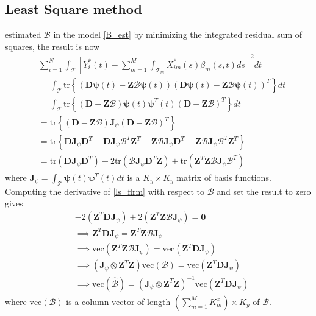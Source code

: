 \subsection{Least Square method}
\cite{olberd:ramsay} estimated $\bm{\mathcal{B}}$ in the model \eqref{B_est} by minimizing the integrated residual sum of squares, the result is now
\begin{align}
& \sum_{i=1}^{N} \int_{\mathcal{T}} \left[Y^{*}_i(t) - \sum_{m=1}^{M} \int_{\mathcal{T}_m} X^{*}_{im}(s) \beta_{m}(s,t)ds\right]^2 dt \nonumber \\
&= \int_{\mathcal{T}} \text{tr} \left\{\left(\bm{D} \bm{\psi}(t) - \bm{Z} \bm{\mathcal{B}} \bm{\psi}(t)\right)\left(\bm{D} \bm{\psi}(t) - \bm{Z} \bm{\mathcal{B}} \bm{\psi}(t)\right)^T \right\} dt \nonumber \\
&= \int_{\mathcal{T}} \text{tr} \left\{\left(\bm{D} - \bm{Z} \bm{\mathcal{B}} \right) \bm{\psi}(t)  \bm{\psi}^T(t) \left(\bm{D} - \bm{Z} \bm{\mathcal{B}} \right)^T \right\} dt \nonumber \\
&= \text{tr} \left\{\left(\bm{D} - \bm{Z} \bm{\mathcal{B}} \right) \bm{J}_{\psi} \left(\bm{D} - \bm{Z} \bm{\mathcal{B}} \right)^T \right\} \nonumber \\
&= \text{tr} \left\{\bm{D}\bm{J}_{\psi}\bm{D}^T - \bm{D}\bm{J}_{\psi}\bm{\mathcal{B}}^T\bm{Z}^T - \bm{Z}\bm{\mathcal{B}}\bm{J}_{\psi}\bm{D}^T + \bm{Z}\bm{\mathcal{B}} \bm{J}_{\psi} \bm{\mathcal{B}}^T \bm{Z}^T  \right\} \nonumber \\
&= \text{tr} \left(\bm{D}\bm{J}_{\psi}\bm{D}^T\right) - 2 \text{tr} \left(\bm{\mathcal{B}}\bm{J}_{\psi}\bm{D}^T\bm{Z}\right) + \text{tr} \left(\bm{Z}^T \bm{Z}\bm{\mathcal{B}}\bm{J}_{\psi}\bm{\mathcal{B}}^T \right) \label{ls_flrm}
\end{align}
where $\bm{J}_{\psi} = \int_{\mathcal{T}} \bm{\psi}(t) \bm{\psi}^T(t)dt$ is a $K_y \times K_y$ matrix of basis functions. Computing the derivative of \eqref{ls_flrm} with respect to $\bm{\mathcal{B}}$ and set the result to zero gives
\begin{align}
& -2 \left(\bm{Z}^T \bm{D} \bm{J}_{\psi} \right) + 2\left(\bm{Z}^T\bm{Z} \bm{\mathcal{B}}\bm{J}_{\psi} \right) = \bm{0} \nonumber \\
&\implies \bm{Z}^T \bm{D} \bm{J}_{\psi} = \bm{Z}^T\bm{Z} \bm{\mathcal{B}} \bm{J}_{\psi} \nonumber \\
&\implies \text{vec}\left(\bm{Z}^T\bm{Z} \bm{\mathcal{B}} \bm{J}_{\psi}\right) = \text{vec} \left(\bm{Z}^T \bm{D} \bm{J}_{\psi}\right) \nonumber \\
&\implies \left(\bm{J}_{\psi} \otimes \bm{Z}^T\bm{Z} \right) \text{vec}\left(\bm{\mathcal{B}}\right) = \text{vec} \left(\bm{Z}^T \bm{D} \bm{J}_{\psi}\right) \nonumber \\
&\implies \text{vec}\left(\hat{\bm{\mathcal{B}}}\right) = \left(\bm{J}_{\psi} \otimes \bm{Z}^T\bm{Z} \right)^{-1} \text{vec} \left(\bm{Z}^T \bm{D} \bm{J}_{\psi}\right)\label{ls_flrm2} 
\end{align}
where $\text{vec}\left(\bm{\mathcal{B}}\right)$ is a column vector of length $\left(\sum_{m=1}^{M} K_m^{x}\right) \times K_y$ of $\bm{\mathcal{B}}$.

